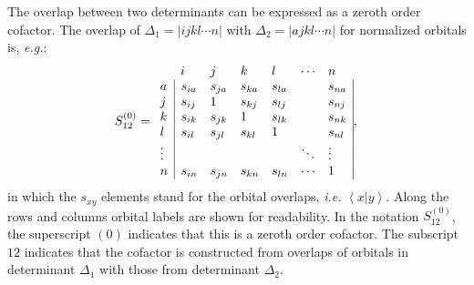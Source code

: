 The overlap between two determinants can be expressed as  a zeroth order cofactor. The overlap of $\Delta_{1} = |ijkl \cdots n|$ with $\Delta_{2} = |ajkl \cdots n|$ for normalized orbitals is, \textit{e.g.}:
\begin{equation}
S_{12}^{(0)}=
\begin{array}{lllllll}
 &  i & j & k & l & \cdots & n \\
 a &  \multicolumn{1}{|l}{s_{ia}} & s_{ja}  & s_{ka} & s_{la} & & \multicolumn{1}{l|}{ s_{na} } \\
 j & \multicolumn{1}{|l}{s_{ij}} & 1 & s_{kj} & s_{lj} & & \multicolumn{1}{l|}{s_{nj}} \\
 k & \multicolumn{1}{|l}{s_{ik}} & s_{jk} & 1 & s_{lk} & & \multicolumn{1}{l|}{s_{nk}} \\
 l & \multicolumn{1}{|l}{s_{il}} & s_{jl} & s_{kl} & 1 & & \multicolumn{1}{l|}{s_{nl}} \\
 \vdots & \multicolumn{1}{|l}{ } &   &   & & \ddots & \multicolumn{1}{l|}{\vdots} \\
 n & \multicolumn{1}{|l}{ s_{in}} & s_{jn} & s_{kn} & s_{ln} & \cdots & \multicolumn{1}{l|}{1}
\end{array},\\
\label{ch2.eq.zocofac}
\end{equation}
in which the $s_{xy}$ elements stand for the orbital overlaps, \textit{i.e.} $\left < x | y \right >$. Along the rows and columns orbital labels are shown for readability. In the notation $S_{12}^{(0)}$, the superscript $(0)$ indicates that this is a zeroth order cofactor. The subscript $12$ indicates that the cofactor is constructed from overlaps of orbitals in determinant $\Delta_1$ with those from determinant $\Delta_2$.

